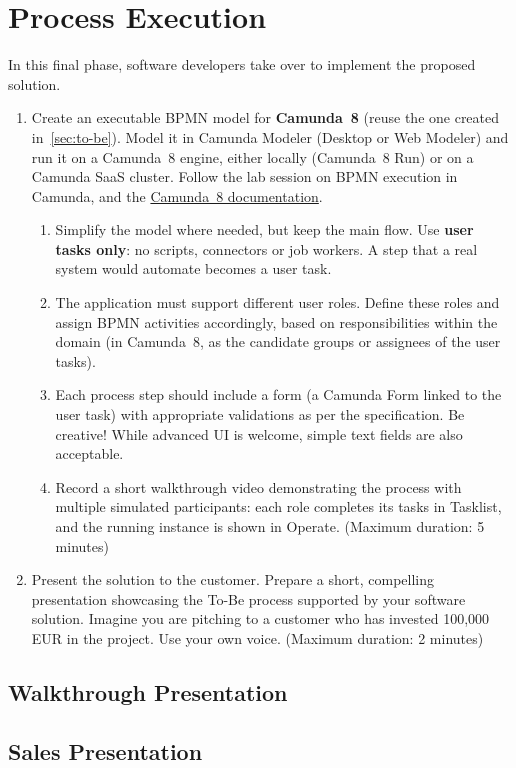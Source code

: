 \chapter{Process Execution}


In this final phase, software developers take over to implement the proposed solution.

\begin{enumerate}
    \item Create an executable BPMN model for \textbf{Camunda~8} (reuse the one created in~\cref{sec:to-be}). Model it in Camunda Modeler (Desktop or Web Modeler) and run it on a Camunda~8 engine, either locally (Camunda~8 Run) or on a Camunda SaaS cluster. Follow the lab session on BPMN execution in Camunda, and the \href{https://docs.camunda.io/}{Camunda~8 documentation}.
    \begin{enumerate}
        \item Simplify the model where needed, but keep the main flow. Use \textbf{user tasks only}: no scripts, connectors or job workers. A step that a real system would automate becomes a user task.
        \item The application must support different user roles. Define these roles and assign BPMN activities accordingly, based on responsibilities within the domain (in Camunda~8, as the candidate groups or assignees of the user tasks).
        \item Each process step should include a form (a Camunda Form linked to the user task) with appropriate validations as per the specification. Be creative! While advanced UI is welcome, simple text fields are also acceptable.
        \item Record a short walkthrough video demonstrating the process with multiple simulated participants: each role completes its tasks in Tasklist, and the running instance is shown in Operate. (Maximum duration: 5 minutes)
    \end{enumerate}
    \item Present the solution to the customer. Prepare a short, compelling presentation showcasing the To-Be process supported by your software solution. Imagine you are pitching to a customer who has invested 100,000 EUR in the project. Use your own voice. (Maximum duration: 2 minutes)
\end{enumerate}

\section{Walkthrough Presentation}

\section{Sales Presentation}

